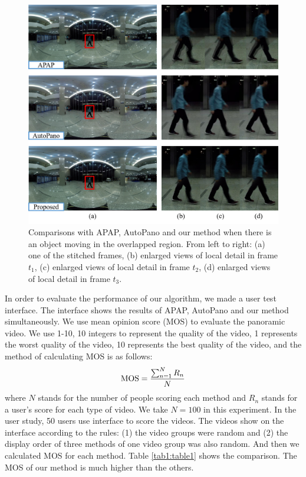 \documentclass[conference]{IEEEtran}
\begin{document}
\begin{figure}[!htpb]
\centering
\includegraphics[scale=0.36]{picture36.png}
\caption{Comparisons with APAP, AutoPano and our method when there is an object moving in the overlapped region. From left to right: (a) one of the stitched frames, (b) enlarged views of local
detail in frame $t_1$, (c) enlarged views of local detail in frame $t_2$, (d) enlarged views of local detail in frame $t_3$.}
\label{fig:pic15}
\end{figure}

In order to evaluate the performance of our algorithm, we made a user test interface. The interface shows the results of APAP, AutoPano and our method simultaneously.
We use mean opinion score (MOS) to evaluate the panoramic video. We use 1-10, 10 integers to represent the quality of the video, 
1 represents the worst quality of the video, 10 represents the best quality of the video, and the method of calculating MOS is as follows:
\begin{equation}
{\rm MOS}=\frac{\sum^{N}_{n=1}{R_n}}{N}
\end{equation}
where $N$ stands for the number of people scoring each method and $R_n$ stands for a user's score for each type of video. We take $N=100$ in this experiment.
In the user study, 50 users use interface to score the videos. The videos show on the interface according to the rules: (1) the video groups were random and 
(2) the display order of three methods of one video group was also random.
And then we calculated MOS for each method. Table \ref{tab1:table1} shows the comparison. The MOS of our method is much higher than the others.
\end{document}
